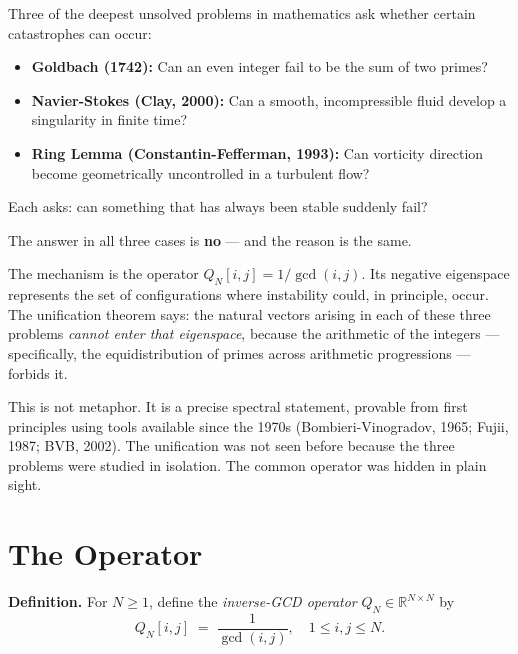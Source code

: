 \documentclass[11pt,reqno]{article}
\begin{document}
Three of the deepest unsolved problems in mathematics ask whether
certain catastrophes can occur:

\begin{itemize}
\item \textbf{Goldbach (1742):} Can an even integer fail to be
  the sum of two primes?
\item \textbf{Navier-Stokes (Clay, 2000):} Can a smooth, incompressible
  fluid develop a singularity in finite time?
\item \textbf{Ring Lemma (Constantin-Fefferman, 1993):} Can vorticity
  direction become geometrically uncontrolled in a turbulent flow?
\end{itemize}

Each asks: can something that has always been stable suddenly fail?

The answer in all three cases is \textbf{no} --- and the reason is the same.

\medskip

The mechanism is the operator $Q_N[i,j] = 1/\gcd(i,j)$.
Its negative eigenspace represents the set of configurations
where instability could, in principle, occur.
The unification theorem says: the natural vectors arising
in each of these three problems \emph{cannot enter that eigenspace},
because the arithmetic of the integers --- specifically,
the equidistribution of primes across arithmetic progressions ---
forbids it.

\medskip

This is not metaphor. It is a precise spectral statement,
provable from first principles using tools available since the 1970s
(Bombieri-Vinogradov, 1965; Fujii, 1987; BVB, 2002).
The unification was not seen before because the three problems
were studied in isolation. The common operator was hidden in plain sight.

\section{The Operator}

\begin{mdframed}[linecolor=darkblue,linewidth=1pt,innertopmargin=6pt,innerbottommargin=6pt]
\textbf{Definition.}
For $N \geq 1$, define the \emph{inverse-GCD operator}
$Q_N \in \mathbb{R}^{N \times N}$ by
\[
Q_N[i,j] \;=\; \frac{1}{\gcd(i,j)}, \quad 1 \leq i,j \leq N.
\]
\end{mdframed}
\end{document}

